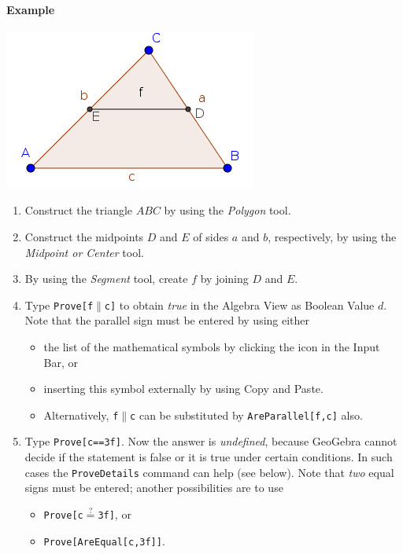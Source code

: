 \documentclass{article}
\begin{document}
\vfill\eject %

\paragraph{Example}
\begin{center}
\includegraphics[scale=0.5]{Prove-example}
\end{center}
\begin{enumerate}
\item Construct the triangle $ABC$ by using the \textit{Polygon} tool.
\item Construct the midpoints $D$ and $E$ of sides $a$ and $b$, respectively, by using the \textit{Midpoint or Center} tool.
\item By using the \textit{Segment} tool, create $f$ by joining $D$ and $E$.
\item Type \texttt{Prove[f$\parallel$c]} to obtain \textit{true} in the Algebra View as Boolean Value $d$. Note that the parallel sign must be entered by using either
\begin{itemize}
\item the list of the mathematical symbols by clicking the \framebox{$\alpha$} icon in the Input Bar, or
\item inserting this symbol externally by using Copy and Paste.
\item Alternatively, \texttt{f$\parallel$c} can be substituted by \texttt{AreParallel[f,c]} also.
\end{itemize}

\item Type \texttt{Prove[c==3f]}. Now the answer is \textit{undefined}, because GeoGebra cannot decide if the statement is false or it is true under certain conditions. In such cases the \texttt{ProveDetails} command can help (see below). Note that \textit{two} equal signs must be entered; another possibilities are to use
\begin{itemize}
    \item \texttt{Prove[c$\stackrel{?}{=}$3f]}, or
    \item \texttt{Prove[AreEqual[c,3f]]}.
\end{itemize}

\end{enumerate}
\end{document}
